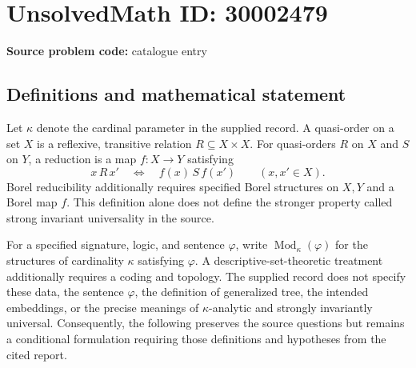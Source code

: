 \documentclass[11pt]{article}
\begin{document}
\section*{UnsolvedMath ID: 30002479}
\textbf{Source problem code:} catalogue entry
\subsection{Definitions and mathematical statement}
Let \(\kappa\) denote the cardinal parameter in the supplied record. A quasi-order on a set \(X\) is a reflexive, transitive relation \(R\subseteq X\times X\). For quasi-orders \(R\) on \(X\) and \(S\) on \(Y\), a reduction is a map \(f:X\to Y\) satisfying
\[
 x\,R\,x'\quad\Longleftrightarrow\quad f(x)\,S\,f(x')
 \qquad(x,x'\in X).
\]
Borel reducibility additionally requires specified Borel structures on \(X,Y\) and a Borel map \(f\). This definition alone does not define the stronger property called strong invariant universality in the source.

For a specified signature, logic, and sentence \(\varphi\), write \(\operatorname{Mod}_{\kappa}(\varphi)\) for the structures of cardinality \(\kappa\) satisfying \(\varphi\). A descriptive-set-theoretic treatment additionally requires a coding and topology. The supplied record does not specify these data, the sentence \(\varphi\), the definition of generalized tree, the intended embeddings, or the precise meanings of \(\kappa\)-analytic and strongly invariantly universal. Consequently, the following preserves the source questions but remains a conditional formulation requiring those definitions and hypotheses from the cited report.
\end{document}
